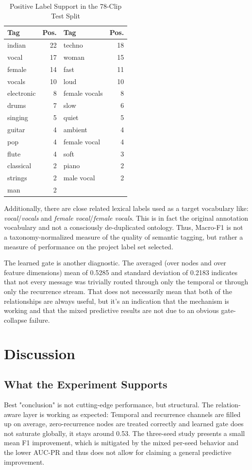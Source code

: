 \documentclass[conference]{IEEEtran}
\begin{document}
\begin{table}[t]
\caption{Positive Label Support in the 78-Clip Test Split}
\label{tab:support}
\centering
\scriptsize
\setlength{\tabcolsep}{3pt}
\begin{tabular}{l r l r}
\toprule
Tag & Pos. & Tag & Pos.\\
\midrule
indian & 22 & techno & 18\\
vocal & 17 & woman & 15\\
female & 14 & fast & 11\\
vocals & 10 & loud & 10\\
electronic & 8 & female vocals & 8\\
drums & 7 & slow & 6\\
singing & 5 & quiet & 5\\
guitar & 4 & ambient & 4\\
pop & 4 & female vocal & 4\\
flute & 4 & soft & 3\\
classical & 2 & piano & 2\\
strings & 2 & male vocal & 2\\
man & 2 & & \\
\bottomrule
\end{tabular}
\end{table}

Additionally, there are close related lexical labels used as a target vocabulary like: \emph{vocal}/\emph{vocals} and \emph{female vocal}/\emph{female vocals}. This is in fact the original annotation vocabulary and not a consciously de-duplicated ontology. Thus, Macro-F1 is not a taxonomy-normalized measure of the quality of semantic tagging, but rather a measure of performance on the project label set selected.

The learned gate is another diagnostic. The averaged (over nodes and over feature dimensions) mean of 0.5285 and standard deviation of 0.2183 indicates that not every message was trivially routed through only the temporal or through only the recurrence stream. That does not necessarily mean that both of the relationships are always useful, but it's an indication that the mechanism is working and that the mixed predictive results are not due to an obvious gate-collapse failure.

\section{Discussion}
\subsection{What the Experiment Supports}
Best "conclusion" is not cutting-edge performance, but structural. The relation-aware layer is working as expected: Temporal and recurrence channels are filled up on average, zero-recurrence nodes are treated correctly and learned gate does not saturate globally, it stays around 0.53. The three-seed study presents a small mean F1 improvement, which is mitigated by the mixed per-seed behavior and the lower AUC-PR and thus does not allow for claiming a general predictive improvement.
\end{document}
